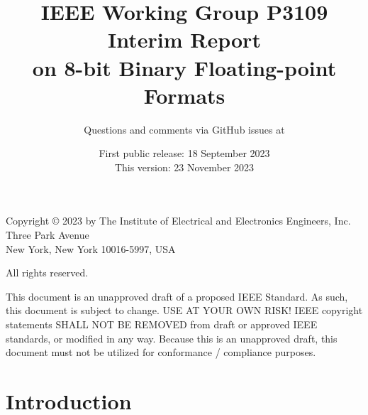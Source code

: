 \documentclass{article}
\title{
IEEE Working Group P3109 Interim Report\\
on
8-bit Binary Floating-point Formats
}
\author{
Questions and comments via GitHub issues at\\\medskip
\myurl{https://github.com/P3109/Public}
}
\date{
First public release: 18 September 2023
\\
\medskip
This version: 23 November 2023
}
\begin{document}
\maketitle

\begin{table}[b]
Copyright © 2023 by The Institute of Electrical and Electronics Engineers, Inc.\\
Three Park Avenue\\
New York, New York 10016-5997, USA

All rights reserved.

This document is an unapproved draft of a proposed IEEE Standard. As such, this document is subject to change. USE AT YOUR OWN RISK! IEEE copyright statements SHALL NOT BE REMOVED from draft or approved IEEE standards, or modified in any way. Because this is an unapproved draft, this document must not be utilized for conformance / compliance purposes.
\end{table}



\clearpage

\tableofcontents

\clearpage


\section{Introduction}
\end{document}
